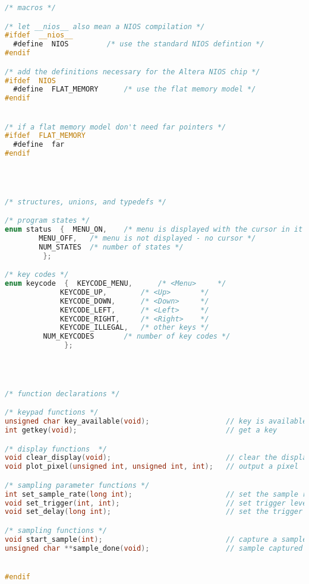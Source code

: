\begin{lstlisting}[language=C]
/* macros */

/* let __nios__ also mean a NIOS compilation */
#ifdef  __nios__
  #define  NIOS			/* use the standard NIOS defintion */
#endif

/* add the definitions necessary for the Altera NIOS chip */
#ifdef  NIOS
  #define  FLAT_MEMORY		/* use the flat memory model */
#endif


/* if a flat memory model don't need far pointers */
#ifdef  FLAT_MEMORY
  #define  far
#endif




/* structures, unions, and typedefs */

/* program states */
enum status  {  MENU_ON,	/* menu is displayed with the cursor in it */
		MENU_OFF,	/* menu is not displayed - no cursor */
		NUM_STATES	/* number of states */
	     };

/* key codes */
enum keycode  {  KEYCODE_MENU,      /* <Menu>     */
	         KEYCODE_UP,        /* <Up>       */
	         KEYCODE_DOWN,      /* <Down>     */
	         KEYCODE_LEFT,      /* <Left>     */
	         KEYCODE_RIGHT,     /* <Right>    */
	         KEYCODE_ILLEGAL,   /* other keys */
		 NUM_KEYCODES       /* number of key codes */
              }; 




/* function declarations */

/* keypad functions */
unsigned char key_available(void);					// key is available
int getkey(void);  									// get a key

/* display functions  */
void clear_display(void);			      			// clear the display
void plot_pixel(unsigned int, unsigned int, int);   // output a pixel

/* sampling parameter functions */
int set_sample_rate(long int);						// set the sample rate
void set_trigger(int, int);							// set trigger level and slope
void set_delay(long int);							// set the trigger delay time

/* sampling functions */
void start_sample(int);								// capture a sample
unsigned char **sample_done(void);					// sample captured status


#endif
\end{lstlisting}

